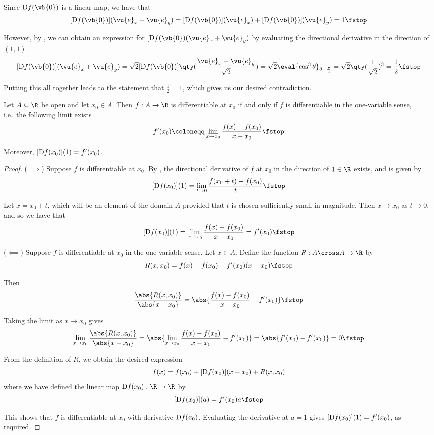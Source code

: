 Since \( \D f(\vb{0}) \) is a linear map, we have that
\[ [\D f(\vb{0})](\vu{e}_x+\vu{e}_y)=[\D f(\vb{0})](\vu{e}_x)+[\D f(\vb{0})](\vu{e}_y)=1\fstop \]

However, by , we can obtain an expression for \( [\D f(\vb{0})(\vu{e}_x+\vu{e}_y) \) by evaluating the directional derivative in the direction of \( (1,1) \).
\[ [\D f(\vb{0})](\vu{e}_x+\vu{e}_y)=\sqrt{2}[\D f(\vb{0})]\qty(\frac{\vu{e}_x+\vu{e}_y}{\sqrt{2}})=\sqrt{2}\eval{\cos^3\theta}_{\theta=\frac{\pi}{4}}=\sqrt{2}\qty(\frac{1}{\sqrt{2}})^3=\frac{1}{2}\fstop \]

Putting this all together leads to the statement that \( \frac{1}{2}=1 \), which gives us our desired contradiction.

\begin{proposition}
  Let \( A\subseteq\R \) be open and let \( x_0\in A \). Then \( f:A\to\R \) is differentiable at \( x_0 \) if and only if \( f \) is differentiable in the one-variable sense, i.e.\ the following limit exists
  \[ f'(x_0)\coloneqq\lim_{x\to x_0}\frac{f(x)-f(x_0)}{x-x_0}\fstop \]

  Moreover, \( [\text{D} f(x_0)](1)=f'(x_0) \).
\end{proposition}
\begin{proof}
  (\( \implies \)) Suppose \( f \) is differentiable at \( x_0 \). By , the directional derivative of \( f \) at \( x_0 \) in the direction of \( 1\in\R \) exists, and is given by
  \[ [\D f(x_0)](1)=\lim_{t\to 0}\frac{f(x_0+t)-f(x_0)}{t}\fstop \]

  Let \( x=x_0+t \), which will be an element of the domain \( A \) provided that \( t \) is chosen sufficiently small in magnitude. Then \( x\to x_0 \) as \( t\to 0 \), and so we have that
  \[ [\D f(x_0)](1)=\lim_{x\to x_0}\frac{f(x)-f(x_0)}{x-x_0}=f'(x_0)\fstop \]

  (\( \impliedby \)) Suppose \( f \) is differentiable at \( x_0 \) in the one-variable sense. Let \( x\in A \). Define the function \( R:A\cross A\to\R \) by
  \[ R(x,x_0)=f(x)-f(x_0)-f'(x_0)(x-x_0)\fstop \]

  Then
  \[ \frac{\abs{R(x,x_0)}}{\abs{x-x_0}}=\abs{\frac{f(x)-f(x_0)}{x-x_0}-f'(x_0)}\fstop \]

  Taking the limit as \( x\to x_0 \) gives
  \[ \lim_{x\to x_0}\frac{\abs{R(x,x_0)}}{\abs{x-x_0}}=\abs{\lim_{x\to x_0}\frac{f(x)-f(x_0)}{x-x_0}-f'(x_0)}=\abs{f'(x_0)-f'(x_0)}=0\fstop \]

  From the definition of \( R \), we obtain the desired expression
  \[ f(x)=f(x_0)+[\text{D} f(x_0)](x-x_0)+R(x,x_0) \]
  where we have defined the linear map \( \D f(x_0):\R\to \R \) by
  \[ [\D f(x_0)](a)=f'(x_0)a\fstop \]

  This shows that \( f \) is differentiable at \( x_0 \) with derivative \( \text{D} f(x_0) \). Evaluating the derivative at \( a=1 \) gives \( [\text{D} f(x_0)](1)=f'(x_0) \), as required.
\end{proof}

